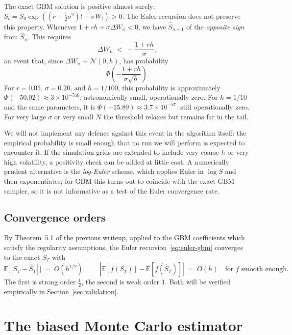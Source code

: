 \documentclass[11pt,a4paper]{article}
\theoremstyle{plain}
\theoremstyle{definition}
\theoremstyle{remark}
\newcommand{\E}{\mathbb{E}}
\begin{document}
The exact GBM solution is positive almost surely: $S_t = S_0
\exp((r - \tfrac{1}{2}\sigma^2) t + \sigma W_t) > 0$. The Euler
recursion does not preserve this property. Whenever
$1 + r h + \sigma \Delta W_n < 0$, we have $\hat S_{n+1}$ of the
\emph{opposite sign} from $\hat S_n$. This requires
\begin{equation}
\Delta W_n \;<\; -\frac{1 + r h}{\sigma},
\end{equation}
an event that, since $\Delta W_n \sim \mathcal{N}(0, h)$, has
probability
\begin{equation}
\Phi\!\left(-\frac{1 + r h}{\sigma \sqrt{h}}\right).
\end{equation}
For $r = 0.05$, $\sigma = 0.20$, and $h = 1/100$, this probability is
approximately $\Phi(-50.02) \approx 3 \times 10^{-546}$: astronomically
small, operationally zero. For $h = 1/10$ and the same parameters, it
is $\Phi(-15.89) \approx 3.7 \times 10^{-57}$: still operationally
zero. For very large $\sigma$ or very small $N$ the threshold relaxes
but remains far in the tail.

We will not implement any defence against this event in the algorithm
itself: the empirical probability is small enough that no run we will
perform is expected to encounter it. If the simulation grids are
extended to include very coarse $h$ or very high volatility, a
positivity check can be added at little cost. A numerically prudent
alternative is the \emph{log-Euler} scheme, which applies Euler in
$\log S$ and then exponentiates; for GBM this turns out to coincide
with the exact GBM sampler, so it is not informative as a
test of the Euler convergence rate.

\subsection{Convergence orders}

By Theorem~5.1 of the previous writeup, applied to the GBM
coefficients which satisfy the regularity assumptions, the Euler
recursion~\eqref{eq:euler-gbm} converges to the exact $S_T$ with
\begin{equation}
\label{eq:euler-orders}
\E\big[\,|S_T - \hat S_T|\,\big] \;=\; O(h^{1/2}),
\qquad
|\E[f(S_T)] - \E[f(\hat S_T)]| \;=\; O(h)
\quad \text{for } f \text{ smooth enough.}
\end{equation}
The first is strong order $\tfrac{1}{2}$, the second is weak order
$1$. Both will be verified empirically in
Section~\ref{sec:validation}.

\section{The biased Monte Carlo estimator}
\label{sec:estimator}
\end{document}
